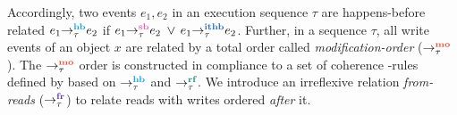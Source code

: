 Accordingly, two events $e_1,e_2$ in an execution sequence $\tau$ are happens-before 
related \ie
$\hb{\tau}{e_1}{e_2}$ if $\seqb{\tau}{e_1}{e_2}$ $\vee$ $\ithb{\tau}{e_1}{e_2}$.
%
Further, in a sequence $\tau$, all write events of an object $x$ are related by a 
total order called {\em modification-order} ($\setMO$).
%
The $\setMO$ order is constructed in compliance to a set of coherence
\lmo-rules defined by \cc \cite{C11}
based on $\setHB$ and $\setRF$. 
%
%
We introduce an irreflexive relation {\em from-reads} ($\setFR$) to relate  
reads with writes ordered {\em after} it.

